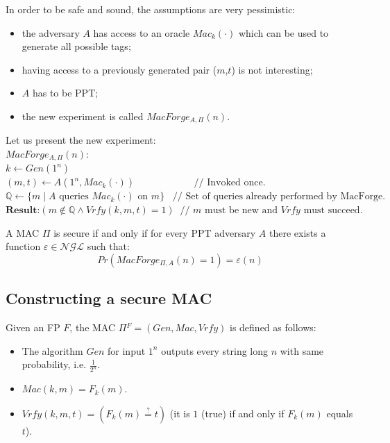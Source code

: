 \documentclass[../main]{subfiles}
\begin{document}
\noindent
In order to be safe and sound, the assumptions are very pessimistic:
\begin{itemize}
    \item the adversary $A$ has access to an oracle $Mac_k(\cdot)$ which can be used to generate all possible tags;
    \item having access to a previously generated pair ($m$,$t$) is not interesting;
    \item $A$ has to be PPT;
    \item the new experiment is called $MacForge_{A,\Pi}(n)$.
\end{itemize}

\noindent
Let us present the new experiment:\\
$MacForge_{A,\Pi}(n):$\\
$k \leftarrow{} Gen(1^n)$\\
$(m,t) \leftarrow{} A(1^n,Mac_k(\cdot)) \;\;\;\;\;\;\;\;\;\;\;\;\;\;\;\;\;\;\;\;\;\; \text{// Invoked once.}$\\
$\mathbb{Q} \leftarrow \{m \; | \; A \text{ queries } Mac_k(\cdot) \text{ on } m\} \;\;\; \text{// Set of queries already performed by MacForge.}$\\
$\textbf{Result:} (m \notin{\mathbb{Q}} \wedge{} Vrfy(k,m,t) = 1) \;\; \text{// $m$ must be new and $Vrfy$ must succeed.}$

\begin{definition}
    A MAC $\Pi$ is secure if and only if for every PPT adversary $A$ there exists a function $\varepsilon{} \in{} \mathcal{NGL}$ such that:
    $$Pr(MacForge_{\Pi,A}(n) = 1) = \varepsilon(n)$$
\end{definition}
\subsection{Constructing a secure MAC}
\begin{definition}
    Given an FP $F$, the MAC $\Pi{}^F = (Gen, Mac, Vrfy)$ is defined as follows:
    \begin{itemize}
        \item The algorithm $Gen$ for input $1^n$ outputs every string long $n$ with same probability, i.e. $\frac{1}{2^n}$.
        \item $Mac(k,m) = F_k(m)$.
        \item $Vrfy(k,m,t) = (F_k(m)\stackrel{?}{=}t)$ (it is $1$ (true) if and only if $F_k(m)$ equals $t$).
    \end{itemize}
\end{definition}
\end{document}
